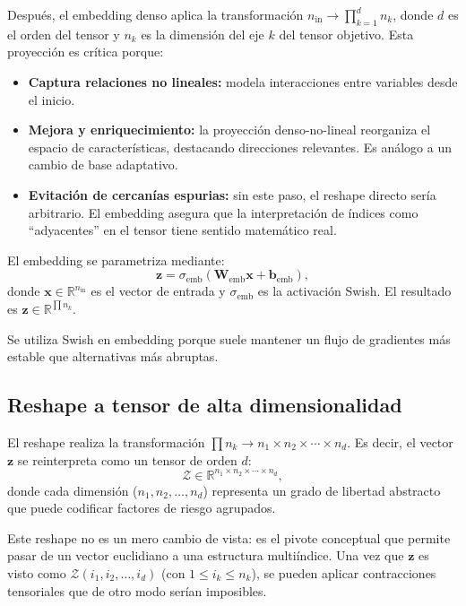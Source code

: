Después, el embedding denso aplica la transformación $n_{\text{in}} \rightarrow \prod_{k=1}^{d} n_k$, donde $d$ es el orden del tensor y $n_k$ es la dimensión del eje $k$ del tensor objetivo. Esta proyección es crítica porque:

\begin{itemize}
  \item \textbf{Captura relaciones no lineales:} modela interacciones entre variables desde el inicio.
  \item \textbf{Mejora y enriquecimiento:} la proyección denso-no-lineal reorganiza el espacio de características, destacando direcciones relevantes. Es análogo a un cambio de base adaptativo.
  \item \textbf{Evitación de cercanías espurias:} sin este paso, el reshape directo sería arbitrario. El embedding asegura que la interpretación de índices como ``adyacentes'' en el tensor tiene sentido matemático real.
\end{itemize}

El embedding se parametriza mediante:
\begin{equation}
\mathbf{z} = \sigma_{\text{emb}}\left(\mathbf{W}_{\text{emb}} \mathbf{x} + \mathbf{b}_{\text{emb}}\right),
\label{eq:qi-embedding}
\end{equation}
donde $\mathbf{x} \in \mathbb{R}^{n_{\text{in}}}$ es el vector de entrada y $\sigma_{\text{emb}}$ es la activación Swish. El resultado es $\mathbf{z} \in \mathbb{R}^{\prod n_k}$.

Se utiliza Swish en embedding porque suele mantener un flujo de gradientes más estable que alternativas más abruptas.

\subsection{Reshape a tensor de alta dimensionalidad}

El reshape realiza la transformación $\prod n_k \rightarrow n_1 \times n_2 \times \cdots \times n_d$. Es decir, el vector $\mathbf{z}$ se reinterpreta como un tensor de orden $d$:
\begin{equation}
\mathcal{Z} \in \mathbb{R}^{n_1 \times n_2 \times \cdots \times n_d},
\label{eq:qi-reshape}
\end{equation}
donde cada dimensión ($n_1, n_2, \ldots, n_d$) representa un grado de libertad abstracto que puede codificar factores de riesgo agrupados.

Este reshape no es un mero cambio de vista: es el pivote conceptual que permite pasar de un vector euclidiano a una estructura multiíndice. Una vez que $\mathbf{z}$ es visto como $\mathcal{Z}(i_1, i_2, \ldots, i_d)$ (con $1 \leq i_k \leq n_k$), se pueden aplicar contracciones tensoriales que de otro modo serían imposibles.

